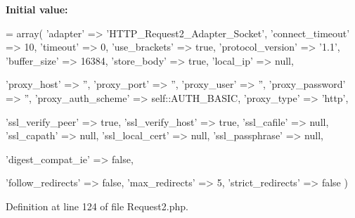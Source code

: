 {\bfseries Initial value\+:}
\begin{DoxyCode}
= array(
        \textcolor{stringliteral}{'adapter'}           => \textcolor{stringliteral}{'HTTP\_Request2\_Adapter\_Socket'},
        \textcolor{stringliteral}{'connect\_timeout'}   => 10,
        \textcolor{stringliteral}{'timeout'}           => 0,
        \textcolor{stringliteral}{'use\_brackets'}      => \textcolor{keyword}{true},
        \textcolor{stringliteral}{'protocol\_version'}  => \textcolor{stringliteral}{'1.1'},
        \textcolor{stringliteral}{'buffer\_size'}       => 16384,
        \textcolor{stringliteral}{'store\_body'}        => \textcolor{keyword}{true},
        \textcolor{stringliteral}{'local\_ip'}          => null,

        \textcolor{stringliteral}{'proxy\_host'}        => \textcolor{stringliteral}{''},
        \textcolor{stringliteral}{'proxy\_port'}        => \textcolor{stringliteral}{''},
        \textcolor{stringliteral}{'proxy\_user'}        => \textcolor{stringliteral}{''},
        \textcolor{stringliteral}{'proxy\_password'}    => \textcolor{stringliteral}{''},
        \textcolor{stringliteral}{'proxy\_auth\_scheme'} => self::AUTH\_BASIC,
        \textcolor{stringliteral}{'proxy\_type'}        => \textcolor{stringliteral}{'http'},

        \textcolor{stringliteral}{'ssl\_verify\_peer'}   => \textcolor{keyword}{true},
        \textcolor{stringliteral}{'ssl\_verify\_host'}   => \textcolor{keyword}{true},
        \textcolor{stringliteral}{'ssl\_cafile'}        => null,
        \textcolor{stringliteral}{'ssl\_capath'}        => null,
        \textcolor{stringliteral}{'ssl\_local\_cert'}    => null,
        \textcolor{stringliteral}{'ssl\_passphrase'}    => null,

        \textcolor{stringliteral}{'digest\_compat\_ie'}  => \textcolor{keyword}{false},

        \textcolor{stringliteral}{'follow\_redirects'}  => \textcolor{keyword}{false},
        \textcolor{stringliteral}{'max\_redirects'}     => 5,
        \textcolor{stringliteral}{'strict\_redirects'}  => \textcolor{keyword}{false}
    )
\end{DoxyCode}


Definition at line 124 of file Request2.\+php.

\mbox{\label{classHTTP__Request2_a1a4f35074ef955bfe726e85b76ed17a9}} 
